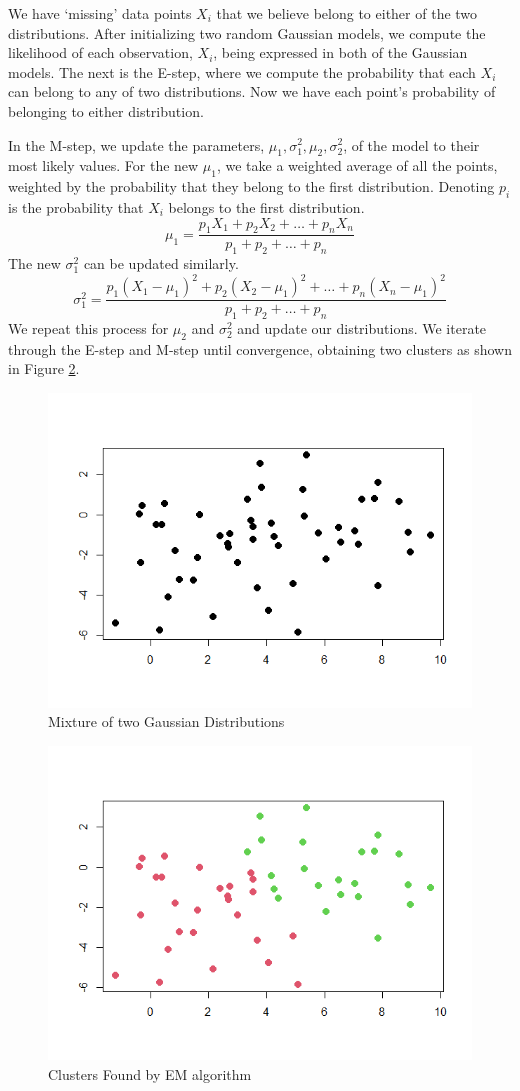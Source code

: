 \documentclass[11pt]{article}
\begin{document}
We have `missing' data points $X_i$ that we believe belong to either of the two distributions. After initializing two random Gaussian models, we compute the likelihood of each observation, $X_i$, being expressed in both of the Gaussian models. The next is the E-step, where we compute the probability that each $X_i$ can belong to any of two distributions. Now we have each point's probability of belonging to either distribution. 

In the M-step, we update the parameters, $\mu_1,\sigma^2_1, \mu_2,\sigma^2_2$, of the model to their most likely values. For the new $\mu_1$, we take a weighted average of all the points, weighted by the probability that they belong to the first distribution. Denoting $p_i$ is the probability that $X_i$ belongs to the first distribution. 
\[\mu_1=\frac{p_1X_1+p_2X_2+\dots+p_nX_n}{p_1+p_2+\dots+p_n}\]
The new $\sigma^2_1$ can be updated similarly. 
\[\sigma^2_1=\frac{p_1(X_1-\mu_1)^2+p_2(X_2-\mu_1)^2+\dots+p_n(X_n-\mu_1)^2}{p_1+p_2+\dots+p_n}\]
We repeat this process for $\mu_2$ and $\sigma^2_2$ and update our distributions. We iterate through the E-step and M-step until convergence, obtaining two clusters as shown in Figure \ref{fig:clustering2}. 




\begin{figure}[H]
    \centering
    \includegraphics[width = 10 cm]{nocolor.png}
    \caption{Mixture of two Gaussian Distributions}
    \label{fig:clustering1}
\end{figure}


\begin{figure}[H]
    \centering
    \includegraphics[width = 10 cm]{clustering.png}
    \caption{Clusters Found by EM algorithm}
    \label{fig:clustering2}
\end{figure}
\end{document}
